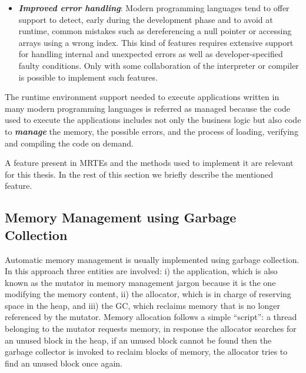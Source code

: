 \begin{itemize}
\item \textbf{\textit{Improved error handling}}:
Modern programming languages tend to offer support to detect, early during the development phase and to avoid at runtime, common mistakes such as dereferencing a null pointer or accessing arrays using a wrong index.
This kind of features requires extensive support for handling internal and unexpected errors as well as developer-specified faulty conditions.
Only with some collaboration of the interpreter or  compiler is possible to implement such features.
\end{itemize}   

The runtime environment support needed to execute applications written in many modern programming languages is referred as managed because the code used to execute the applications includes not only the business logic but also code to \textit{\textbf{manage}} the memory, the possible errors, and the process of loading, verifying and compiling the code on demand.

A feature present in MRTEs and the methods used to implement it are relevant for this thesis.
In the rest of this section we briefly describe the mentioned feature.

\subsection{Memory Management using Garbage Collection}

Automatic memory management is usually implemented using garbage collection.
In this approach three entities are involved: i) the application, which is also known as the mutator in memory management jargon because it is the one modifying the memory content, ii) the allocator, which is in charge of reserving space in the heap, and iii) the \gls{GC}, which reclaims memory that is no longer referenced by the mutator.
Memory allocation follows a simple ``script'': a thread belonging to the mutator requests memory, in response the allocator searches for an unused block in the heap, if an unused block cannot be found then the garbage collector is invoked to reclaim blocks of memory, the allocator tries to find an unused block once again.

